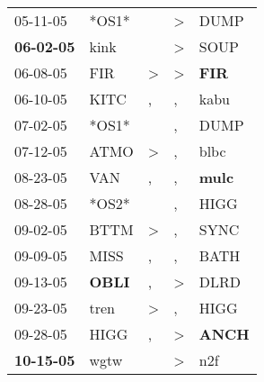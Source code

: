 \begin{supertabular}{p{0.07\textwidth}p{0.06\textwidth}p{0.02\textwidth}p{0.02\textwidth}p{0.06\textwidth}}
          05-11-05\textsuperscript{} &                            *OS1* &                  &     \textgreater &           DUMP\textsuperscript{} \\
 \textbf{06-02-05\textsuperscript{}} &           kink\textsuperscript{} &                  &     \textgreater &           SOUP\textsuperscript{} \\
          06-08-05\textsuperscript{} &            FIR\textsuperscript{} &     \textgreater &     \textgreater &   \textbf{FIR\textsuperscript{}} \\
          06-10-05\textsuperscript{} &           KITC\textsuperscript{} &                , &                , &           kabu\textsuperscript{} \\
          07-02-05\textsuperscript{} &                            *OS1* &                  &                , &           DUMP\textsuperscript{} \\
          07-12-05\textsuperscript{} &           ATMO\textsuperscript{} &     \textgreater &                , &           blbc\textsuperscript{} \\
          08-23-05\textsuperscript{} &            VAN\textsuperscript{} &                , &                , &  \textbf{mulc\textsuperscript{}} \\
          08-28-05\textsuperscript{} &                            *OS2* &                  &                , &           HIGG\textsuperscript{} \\
          09-02-05\textsuperscript{} &           BTTM\textsuperscript{} &     \textgreater &                , &           SYNC\textsuperscript{} \\
          09-09-05\textsuperscript{} &           MISS\textsuperscript{} &                , &                , &           BATH\textsuperscript{} \\
          09-13-05\textsuperscript{} &  \textbf{OBLI\textsuperscript{}} &                , &     \textgreater &           DLRD\textsuperscript{} \\
          09-23-05\textsuperscript{} &           tren\textsuperscript{} &     \textgreater &                , &           HIGG\textsuperscript{} \\
          09-28-05\textsuperscript{} &           HIGG\textsuperscript{} &                , &     \textgreater &  \textbf{ANCH\textsuperscript{}} \\
 \textbf{10-15-05\textsuperscript{}} &           wgtw\textsuperscript{} &                  &     \textgreater &            n2f\textsuperscript{} \\

\end{supertabular}
